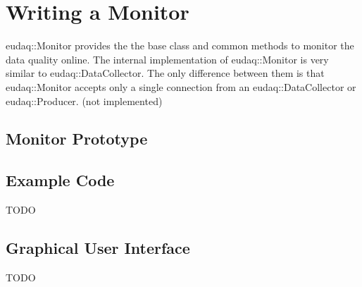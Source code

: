 \section{Writing a Monitor}\label{sec:MonitorWriting}
eudaq::Monitor provides the the base class and common methods to monitor the data quality online. The internal implementation of eudaq::Monitor is very similar to eudaq::DataCollector. The only difference between them is that eudaq::Monitor accepts only a single connection from an eudaq::DataCollector or eudaq::Producer. (not implemented)\\

\subsection{Monitor Prototype}\label{sec:monitor_hh}



\subsection{Example Code}
TODO

\subsection{Graphical User Interface}
TODO
